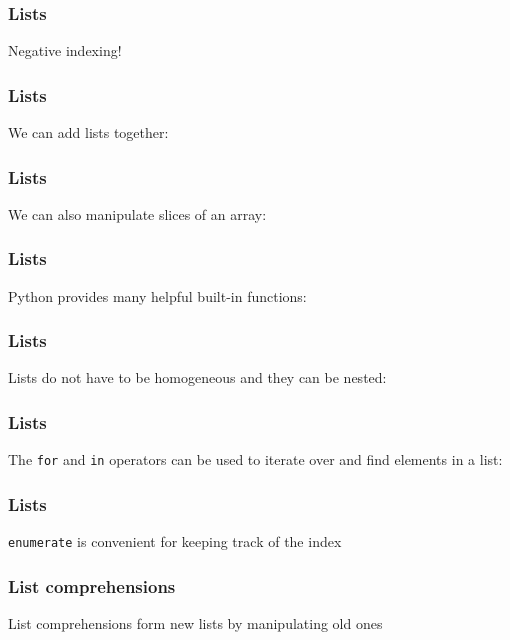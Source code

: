 \documentclass{beamer}
\begin{document}
\begin{frame}
\frametitle{Lists}


Negative indexing!

\end{frame}

\begin{frame}
\frametitle{Lists}

We can add lists together:

\end{frame}

\begin{frame}
\frametitle{Lists}
We can also manipulate slices of an array:


\end{frame}

\begin{frame}
\frametitle{Lists}
Python provides many helpful built-in functions:


\end{frame}

\begin{frame}
\frametitle{Lists}

Lists do not have to be homogeneous and they can be nested:


\end{frame}


\begin{frame}
\frametitle{Lists}

The \texttt{for} and \texttt{in} operators can be used to iterate over and find elements in a list:


\end{frame}

\begin{frame}
\frametitle{Lists}

\texttt{enumerate} is convenient for keeping track of the index


\end{frame}


\begin{frame}
\frametitle{List comprehensions}

List comprehensions form new lists by manipulating old ones


\end{frame}
\end{document}
